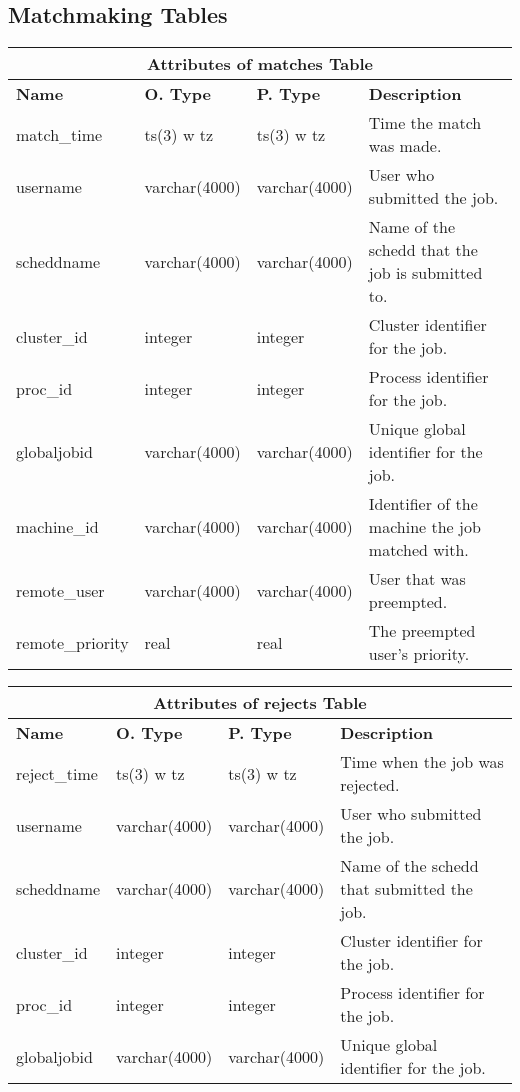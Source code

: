 \subsection{Matchmaking Tables}
\begin{center}
  \begin{tabular}{|l|l|l|p{3.0in}|}\hline
    \multicolumn{4}{|c|}{\textbf{Attributes of matches Table}}\\ \hline
    \textbf{Name} & \textbf{O. Type} & \textbf{P. Type} & \textbf{Description}\\ \hline
    match\_time & ts(3) w tz & ts(3) w tz & Time the match was made.\\ \hline
    username & varchar(4000) & varchar(4000) & User who submitted the job.\\ \hline
    scheddname & varchar(4000) & varchar(4000) & Name of the schedd that the job is submitted to.\\ \hline
    cluster\_id & integer & integer & Cluster identifier for the job.\\ \hline
    proc\_id & integer & integer & Process identifier for the job.\\ \hline
    globaljobid & varchar(4000) & varchar(4000) & Unique global identifier for the job.\\ \hline
    machine\_id & varchar(4000) & varchar(4000) & Identifier of the machine the job matched with.\\ \hline
    remote\_user & varchar(4000) & varchar(4000) & User that was preempted.\\ \hline
    remote\_priority & real & real & The preempted user's priority.\\ \hline
  \end{tabular}
\vspace{24pt}

  \begin{tabular}{|l|l|l|p{3.2in}|}\hline
    \multicolumn{4}{|c|}{\textbf{Attributes of rejects Table}}\\ \hline
    \textbf{Name} & \textbf{O. Type} & \textbf{P. Type} & \textbf{Description}\\ \hline
    reject\_time & ts(3) w tz & ts(3) w tz & Time when the job was rejected.\\ \hline
    username & varchar(4000) & varchar(4000) & User who submitted the job.\\ \hline
    scheddname & varchar(4000) & varchar(4000) & Name of the schedd that submitted the job.\\ \hline
    cluster\_id & integer & integer & Cluster identifier for the job.\\ \hline
    proc\_id & integer & integer & Process identifier for the job.\\ \hline    
    globaljobid & varchar(4000) & varchar(4000) & Unique global identifier for the job.\\ \hline
  \end{tabular}
\vspace{24pt}
\end{center}


